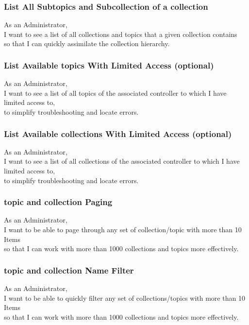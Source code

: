 \subsubsection{List All Subtopics and Subcollection of a collection}
As an Administrator,\\
I want to see a list of all collections and topics that a given collection contains\\
so that I can quickly assimilate the collection hierarchy.

\subsubsection{List Available topics With Limited Access (optional)}

As an Administrator,\\
I want to see a list of all topics of the associated controller to which I have limited access to,\\
to simplify troubleshooting and locate errors.

\subsubsection{List Available collections With Limited Access (optional)}

As an Administrator,\\
I want to see a list of all collections of the associated controller to which I have limited access to,\\
to simplify troubleshooting and locate errors.

\subsubsection{topic and collection Paging}
As an Administrator,\\
I want to be able to page through any set of collection/topic with more than 10 Items \\
so that I can work with more than 1000 collections and topics more effectively.

\subsubsection{topic and collection Name Filter}\label{sec:requirement-topic-filter}
As an Administrator,\\
I want to be able to quickly filter any set of collections/topics with more than 10 Items \\
so that I can work with more than 1000 collections and topics more effectively.


